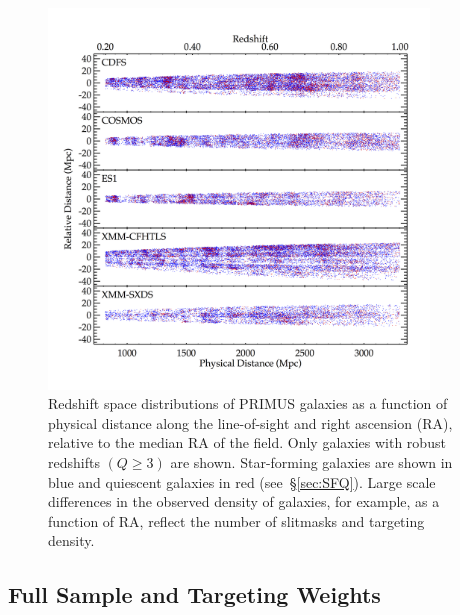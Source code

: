 \begin{figure}
  \centering
  \includegraphics[width=0.9\textwidth,natwidth=600,trim={0.2in 0.5in 0.4in 0.6in},clip]{figures/cone_diagrams.png}
  \caption{Redshift space distributions of PRIMUS galaxies as a function of physical distance along the line-of-sight and right ascension 
(RA), relative to 
the median RA of the field.
Only galaxies with robust redshifts ${(Q \ge 3)}$ are shown.
Star-forming galaxies are shown in blue and quiescent galaxies in red (see~\S\ref{sec:SFQ}). Large scale differences in the observed 
density of galaxies, 
for example, as a function of RA, reflect the number of slitmasks and targeting density.
}
  \label{fig:cone_diagrams}
\end{figure}

\subsection{Full Sample and Targeting Weights}\label{sec:targ_weight}
 

